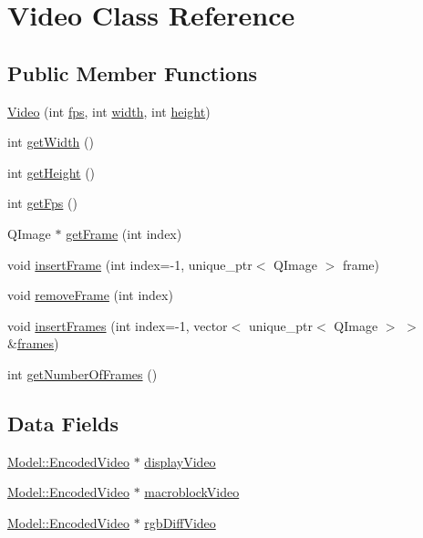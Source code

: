 \hypertarget{classGUI_1_1Video}{}\section{Video Class Reference}
\label{classGUI_1_1Video}
\subsection*{Public Member Functions}
\begin{DoxyCompactItemize}
\item 
\hyperlink{classGUI_1_1Video_ab82b351b35612f4226f75726d958831b}{Video} (int \hyperlink{classGUI_1_1Video_a45b67662d620a977a2cfe519f7ab6273}{fps}, int \hyperlink{classGUI_1_1Video_a2474a5474cbff19523a51eb1de01cda4}{width}, int \hyperlink{classGUI_1_1Video_ad12fc34ce789bce6c8a05d8a17138534}{height})
\item 
int \hyperlink{classGUI_1_1Video_a67a0997183f24da19b776d96c1052998}{get\+Width} ()
\item 
int \hyperlink{classGUI_1_1Video_a07efb2a4e9a982688c8bb3c3f21d1092}{get\+Height} ()
\item 
int \hyperlink{classGUI_1_1Video_a519ad5c0664b9de28c1a6d9dc77f959d}{get\+Fps} ()
\item 
Q\+Image $\ast$ \hyperlink{classGUI_1_1Video_aa350d9b9ba7bad72aeda171dcc537c10}{get\+Frame} (int index)
\item 
void \hyperlink{classGUI_1_1Video_a34274f56faa98faa9697ef24e6fe99ef}{insert\+Frame} (int index=-\/1, unique\+\_\+ptr$<$ Q\+Image $>$ frame)
\item 
void \hyperlink{classGUI_1_1Video_a2467a8d0c175fdcbacea59e9955d88a9}{remove\+Frame} (int index)
\item 
void \hyperlink{classGUI_1_1Video_aa6207c0d55d5353cd1df573ae326f602}{insert\+Frames} (int index=-\/1, vector$<$ unique\+\_\+ptr$<$ Q\+Image $>$ $>$ \&\hyperlink{classGUI_1_1Video_a58a70434ce1e478b27964d9305957e2c}{frames})
\item 
int \hyperlink{classGUI_1_1Video_a038091d64aa83552571228512789d5ee}{get\+Number\+Of\+Frames} ()
\end{DoxyCompactItemize}
\subsection*{Data Fields}
\begin{DoxyCompactItemize}
\item 
\hyperlink{classModel_1_1EncodedVideo}{Model\+::\+Encoded\+Video} $\ast$ \hyperlink{classGUI_1_1Video_ab3171c486c08dcb68f05c418ec4c17ab}{display\+Video}
\item 
\hyperlink{classModel_1_1EncodedVideo}{Model\+::\+Encoded\+Video} $\ast$ \hyperlink{classGUI_1_1Video_ac579683bc7b2499eed6704c87a211234}{macroblock\+Video}
\item 
\hyperlink{classModel_1_1EncodedVideo}{Model\+::\+Encoded\+Video} $\ast$ \hyperlink{classGUI_1_1Video_aa0602ff7e1e4796c78aa15520224b447}{rgb\+Diff\+Video}
\end{DoxyCompactItemize}
